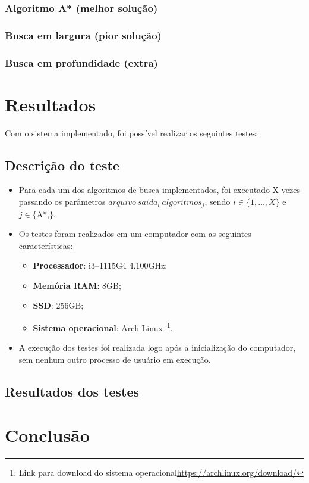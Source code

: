 \documentclass[12pt, a4paper]{article}
\begin{document}
\subsubsection{Algoritmo A* (melhor solução)}\label{sec:astar}
\subsubsection{Busca em largura (pior solução)}\label{sec:bl}
\subsubsection{Busca em profundidade (extra)}\label{sec:bp}

\section{Resultados}\label{sec:resultados}
Com o sistema implementado, foi possível realizar os seguintes testes:
\subsection{Descrição do teste}
\begin{itemize}
    \item Para cada um dos algoritmos de busca implementados,
    foi executado X vezes passando os parâmetros \( arquivo ~ saida_i ~ algoritmos_j \),
    sendo \( i \in \{1, \ldots, X\} \) e \( j \in \{ \)A*,\( \} \).
    \item Os testes foram realizados em um computador com as seguintes características:
    \begin{itemize}
        \item\textbf{Processador}: i3--1115G4 4.100GHz;
        \item\textbf{Memória RAM}: 8GB\@;
        \item\textbf{SSD}: 256GB\@;
        \item\textbf{Sistema operacional}: Arch Linux~\footnote{Link para download do sistema operacional\url{https://archlinux.org/download/}}.
    \end{itemize}
    \item A execução dos testes foi realizada logo após a inicialização do computador, sem nenhum outro processo de usuário em execução.
\end{itemize}

\subsection{Resultados dos testes}\label{sec:res}


\section{Conclusão}\label{sec:concl}

%
\end{document}
